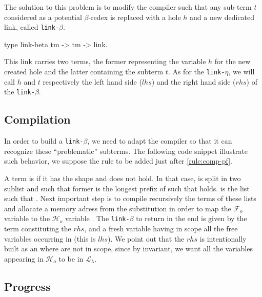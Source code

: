 \documentclass[sigconf,natbib=false,review]{acmart}
\newcommand{\llambda}{\ensuremath{\mathcal{L}_\lambda}\xspace}
\newcommand{\linkbeta}{\texttt{link-}\ensuremath{\beta}\xspace}
\newcommand{\linketa}{\texttt{link-}\ensuremath{\eta}\xspace}
\newcommand{\Fo}{\ensuremath{\mathcal{F}_{\!o}\xspace}} %
\newcommand{\Ho}{\ensuremath{\mathcal{H}_o}\xspace}
\begin{document}
The solution to this problem is to modify the compiler such that any sub-term $t$
considered as a potential $\beta$-redex is replaced with a hole $h$ and a new dedicated
link, called \linkbeta.

\begin{elpicode}
  type link-beta tm -> tm -> link.
\end{elpicode}

\def\rhs{\ensuremath{rhs}\xspace}
\def\lhs{\ensuremath{lhs}\xspace}

This link carries two terms, the former representing the variable $h$ for the
new created hole and the latter containing the subterm $t$. As for the \linketa,
we will call $h$ and $t$ respectively the left hand side (\lhs)
and the right hand side (\rhs) of the \linkbeta.

\subsection{Compilation}

In order to build a \linkbeta, we need to adapt the compiler so that it can
recognize these ``problematic'' subterms. The following code snippet illustrate
such behavior, we suppose the rule to be added just after \cref{rule:comp-pf}.



A term is \maybebeta if it has the shape  and
 does not hold. In that case,  is split in two
sublist  and  such that former is the longest prefix of
 such that  holds.  is the list
such that . Next important step is to compile
recursively the terms of these lists and allocate a memory adress 
from the substitution in order to map the \Fo variable  to
the \Ho variable . The \linkbeta to return in the end is given
by the term  constituting the \rhs,
and a fresh variable  having in scope all the free variables occurring
in  (this is \lhs). We point out that the \rhs is intentionally
built as an  where  are not in scope, since by
invariant, we want all the variables appearing in \Ho to be in \llambda.

\subsection{Progress}
\end{document}

